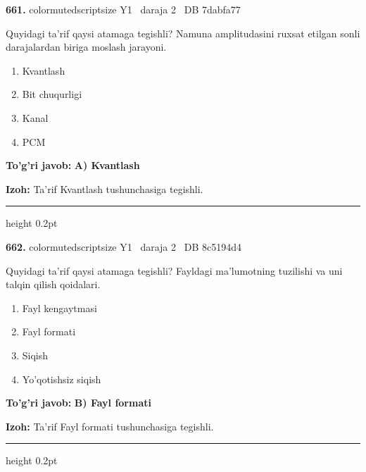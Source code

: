 \documentclass[10pt,a4paper,oneside]{article}
\begin{document}
\noindent\textbf{\color{ink}661.}  {color{muted}scriptsize Y1 \textbullet\ daraja 2 \textbullet\ DB 7dabfa77}
\par
Quyidagi ta'rif qaysi atamaga tegishli? Namuna amplitudasini ruxsat etilgan sonli darajalardan biriga moslash jarayoni.
\begin{enumerate}[label=\Alph*),leftmargin=9mm]
\item Kvantlash
\item Bit chuqurligi
\item Kanal
\item PCM
\end{enumerate}
\begin{tcolorbox}[enhanced,breakable,colback=teal!4,colframe=teal!50!black,boxrule=0.5pt,arc=1.1mm,left=3mm,right=3mm,top=1.7mm,bottom=1.7mm,before skip=2mm,after skip=2mm]
\textbf{\color{teal}To'g'ri javob:} \textbf{A) Kvantlash}
\par\smallskip
\textbf{Izoh:} Ta'rif Kvantlash tushunchasiga tegishli.
\end{tcolorbox}
\vspace{2mm}\hrule height 0.2pt \vspace{3mm}

\noindent\textbf{\color{ink}662.}  {color{muted}scriptsize Y1 \textbullet\ daraja 2 \textbullet\ DB 8c5194d4}
\par
Quyidagi ta'rif qaysi atamaga tegishli? Fayldagi ma'lumotning tuzilishi va uni talqin qilish qoidalari.
\begin{enumerate}[label=\Alph*),leftmargin=9mm]
\item Fayl kengaytmasi
\item Fayl formati
\item Siqish
\item Yo'qotishsiz siqish
\end{enumerate}
\begin{tcolorbox}[enhanced,breakable,colback=teal!4,colframe=teal!50!black,boxrule=0.5pt,arc=1.1mm,left=3mm,right=3mm,top=1.7mm,bottom=1.7mm,before skip=2mm,after skip=2mm]
\textbf{\color{teal}To'g'ri javob:} \textbf{B) Fayl formati}
\par\smallskip
\textbf{Izoh:} Ta'rif Fayl formati tushunchasiga tegishli.
\end{tcolorbox}
\vspace{2mm}\hrule height 0.2pt \vspace{3mm}
\end{document}
